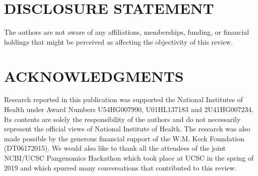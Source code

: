 
\section*{DISCLOSURE STATEMENT}
The authors are not aware of any affiliations, memberships, funding, or financial holdings that
might be perceived as affecting the objectivity of this review. 

\section*{ACKNOWLEDGMENTS}
Research reported in this publication was supported the National Institutes of Health under Award Numbers U54HG007990, U01HL137183 and 2U41HG007234. Its contents are solely the responsibility of the authors and do not necessarily represent the official views of National Institute of Health. The research was also made possible by the generous financial support of the W.M. Keck Foundation (DT06172015). We would also like to thank all the attendees of the joint NCBI/UCSC Pangenomics Hackathon which took place at UCSC in the spring of 2019 and which spurred many conversations that contributed to this review.
